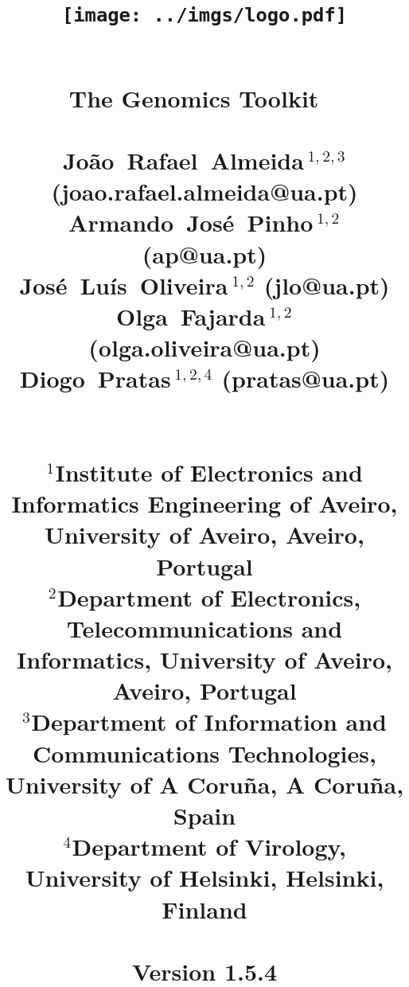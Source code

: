 \documentclass[11pt,journal,compsoc]{report}[1]
\begin{document}
\title{
%
\begin{figure}[h!]
\centerline{\texttt{[image: ../imgs/logo.pdf]}}
\label{logo}
\end{figure}
~\\
\textbf{The Genomics Toolkit}
~\\~\\
\large
Jo\~ao~Rafael~Almeida\,$^{1,2,3}$ (joao.rafael.almeida@ua.pt)\\
Armando~Jos\'e~Pinho\,$^{1,2}$ (ap@ua.pt)\\
Jos\'e~Lu\'is~Oliveira\,$^{1,2}$ (jlo@ua.pt)\\
Olga~Fajarda\,$^{1,2}$ (olga.oliveira@ua.pt)\\
Diogo~Pratas\,$^{1,2,4}$ (pratas@ua.pt)\\
~\\~\\
\small
$^1$Institute of Electronics and Informatics Engineering of Aveiro, University of Aveiro, Aveiro, Portugal\\
$^2$Department of Electronics, Telecommunications and Informatics, University of Aveiro, Aveiro, Portugal\\
$^3$Department of Information and Communications Technologies, University of A Coru\~na, A Coru\~na, Spain\\
$^4$Department of Virology, University of Helsinki, Helsinki, Finland\\
~\\
Version 1.5.4
}
\date{}
\maketitle

\tableofcontents

\def \AminoAcidSequenceToolsPath {sections/Amino_acid_sequence_tools}
\def \FASTQToolsPath {sections/FASTQ_tools}
\def \FASTAToolsPath {sections/FASTA_tools}
\def \GenomicSequenceToolsPath {sections/Genomic_sequence_tools}
\def \GeneralPurposeToolsPath {sections/General_purpose_tools}












\end{document}

